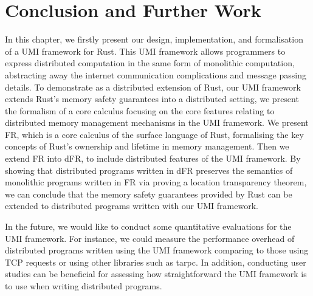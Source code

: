 
\section{Conclusion and Further Work}
\label{chap3:conclusion}
In this chapter, we firstly present our design, implementation, and formalisation of a UMI framework for Rust. This UMI framework allows programmers to express distributed computation in the same form of monolithic computation, abstracting away the internet communication complications and message passing details. To demonstrate as a distributed extension of Rust, our UMI framework extends Rust's memory safety guarantees into a distributed setting, we present the formalism of a core calculus focusing on the core features relating to distributed memory management mechanisms in the UMI framework. We present FR, which is a core calculus of the surface language of Rust, formalising the key concepts of Rust's ownership and lifetime in memory management. Then we extend FR into dFR, to include distributed features of the UMI framework. By showing that distributed programs written in dFR preserves the semantics of monolithic programs written in FR via proving a location transparency theorem, we can conclude that the memory safety guarantees provided by Rust can be extended to distributed programs written with our UMI framework.

\begin{highlightnew}
In the future, we would like to conduct some quantitative evaluations for the UMI framework. For instance, we could measure the performance overhead of distributed programs written using the UMI framework comparing to those using TCP requests or using other libraries such as tarpc. In addition, conducting user studies can be beneficial for assessing how straightforward the UMI framework is to use when writing distributed programs.
\end{highlightnew}

